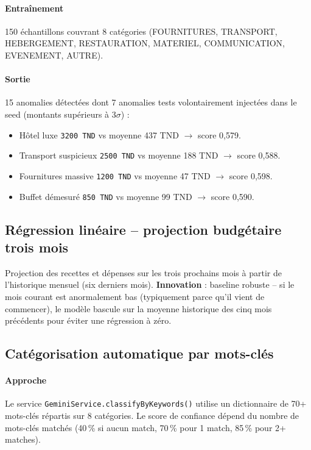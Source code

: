 \documentclass[11pt,a4paper]{article}
\begin{document}
\paragraph{Entraînement} 150 échantillons couvrant 8 catégories (FOURNITURES, TRANSPORT, HEBERGEMENT, RESTAURATION, MATERIEL, COMMUNICATION, EVENEMENT, AUTRE).

\paragraph{Sortie} 15 anomalies détectées dont 7 anomalies tests volontairement injectées dans le seed (montants supérieurs à 3$\sigma$) :

\begin{itemize}[leftmargin=*]
  \item Hôtel luxe \texttt{3200 TND} vs moyenne 437 TND $\rightarrow$ score 0{,}579.
  \item Transport suspicieux \texttt{2500 TND} vs moyenne 188 TND $\rightarrow$ score 0{,}588.
  \item Fournitures massive \texttt{1200 TND} vs moyenne 47 TND $\rightarrow$ score 0{,}598.
  \item Buffet démesuré \texttt{850 TND} vs moyenne 99 TND $\rightarrow$ score 0{,}590.
\end{itemize}

\subsection{Régression linéaire -- projection budgétaire trois mois}

Projection des recettes et dépenses sur les trois prochains mois à partir de l'historique mensuel (six derniers mois). \textbf{Innovation} : baseline robuste -- si le mois courant est anormalement bas (typiquement parce qu'il vient de commencer), le modèle bascule sur la moyenne historique des cinq mois précédents pour éviter une régression à zéro.

\subsection{Catégorisation automatique par mots-clés}

\paragraph{Approche} Le service \texttt{GeminiService.classifyByKeywords()} utilise un dictionnaire de 70+ mots-clés répartis sur 8 catégories. Le score de confiance dépend du nombre de mots-clés matchés (40\,\% si aucun match, 70\,\% pour 1 match, 85\,\% pour 2+ matches).
\end{document}
